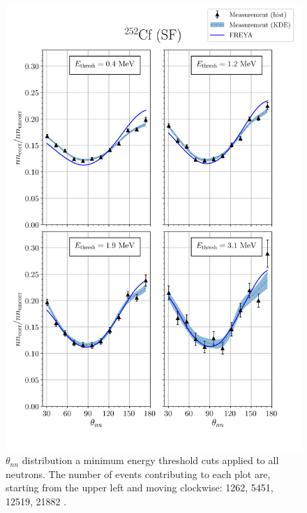 \begin{figure}
\centering
    \includegraphics[width = \textwidth]{Content/Results/FinalCf252Resultw_freya0KDE.png}
    \caption{
    $\theta_{nn}$ distribution a minimum energy threshold cuts applied to all neutrons.
    The number of events contributing to each plot are, starting from the upper left and moving clockwise: 1262, 5451, 12519, 21882  .}
    \label{fig:Cf(0)}
\end{figure}
